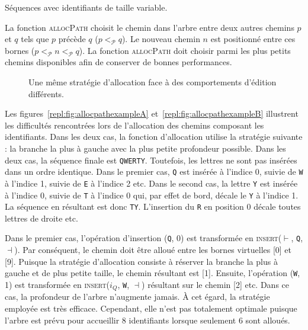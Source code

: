 \begin{algorithm}[h]
  
  \caption[Séquences avec identifiants de taille variable]
  {\label{repl:algo:general}Séquences avec identifiants de taille variable.}
\end{algorithm}

La fonction \textsc{allocPath} choisit le chemin dans l'arbre entre deux autres
chemins $p$ et $q$ tels que $p$ précède $q$ ($p <_\mathcal{P} q$). Le nouveau
chemin $n$ est positionné entre ces bornes
($p <_\mathcal{P} n <_\mathcal{P} q$). La fonction \textsc{allocPath} doit
choisir parmi les plus petits chemins disponibles afin de conserver de bonnes
performances.

\begin{figure}
  \begin{center}
  \hspace{30pt}
  \end{center}
  \caption[Une stratégie d'allocation contre les comportements d'édition] {Une
    même stratégie d'allocation face à des comportements d'édition différents.}
\end{figure}

Les figures~\ref{repl:fig:allocpathexampleA} et~\ref{repl:fig:allocpathexampleB}
illustrent les difficultés rencontrées lors de l'allocation des chemins
composant les identifiants. Dans les deux cas, la fonction d'allocation utilise
la stratégie suivante : la branche la plus à gauche avec la plus petite
profondeur possible. Dans les deux cas, la séquence finale est
\texttt{QWERTY}. Toutefois, les lettres ne sont pas insérées dans un ordre
identique. Dans le premier cas, \texttt{Q} est insérée à l'indice 0, suivie de
\texttt{W} à l'indice 1, suivie de \texttt{E} à l'indice 2 etc.  Dans le second
cas, la lettre \texttt{Y} est insérée à l'indice 0, suivie de \texttt{T} à
l'indice 0 qui, par effet de bord, décale le \texttt{Y} à l'indice 1. La
séquence en résultant est donc \texttt{TY}. L'insertion du \texttt{R} en
position 0 décale toutes lettres de droite etc.

Dans le premier cas, l'opération d'insertion (\texttt{Q}, 0) est transformée en
\textsc{insert}($\vdash$, \texttt{Q}, $\dashv$). Par conséquent, le chemin doit
être alloué entre les bornes virtuelles [0] et [9]. Puisque la stratégie
d'allocation consiste à réserver la branche la plus à gauche et de plus petite
taille, le chemin résultant est [1]. Ensuite, l'opération (\texttt{W}, 1) est
transformée en \textsc{insert}($i_Q$, \texttt{W}, $\dashv$) résultant sur le
chemin [2] etc.  Dans ce cas, la profondeur de l'arbre n'augmente jamais. À cet
égard, la stratégie employée est très efficace. Cependant, elle n'est pas
totalement optimale puisque l'arbre est prévu pour accueillir 8 identifiants
lorsque seulement 6 sont alloués.

